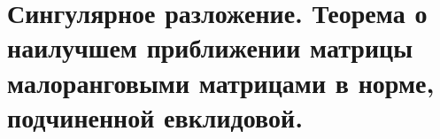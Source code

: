 \section{Сингулярное разложение. Теорема о наилучшем приближении матрицы малоранговыми матрицами в норме, подчиненной евклидовой.}
